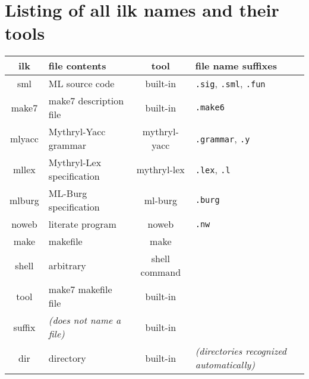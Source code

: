 
\section{Listing of all ilk names and their tools}

\begin{center}
\begin{tabular}{c|l|c|l}
ilk & file contents & tool & file name suffixes \\
\hline\hline
sml & ML source code & built-in & {\tt .sig}, {\tt .sml}, {\tt .fun} \\
make7  & make7 description file & built-in & {\tt .make6} \\
mlyacc & Mythryl-Yacc grammar & mythryl-yacc & {\tt .grammar}, {\tt .y} \\
mllex & Mythryl-Lex specification & mythryl-lex & {\tt .lex}, {\tt .l} \\
mlburg & ML-Burg specification & ml-burg & {\tt .burg} \\
noweb & literate program & noweb & {\tt .nw} \\
make & makefile & make & \\
shell & arbitrary & shell command & \\
tool & make7 makefile file & built-in & \\
suffix & {\it (does not name a file)} & built-in & \\
dir & directory & built-in & {\it (directories recognized automatically)}
\end{tabular}
\end{center}
